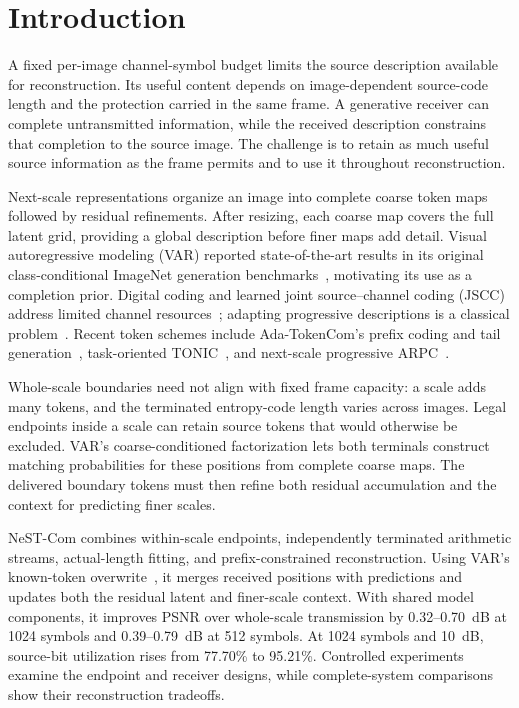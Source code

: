 \section{Introduction}
A fixed per-image channel-symbol budget limits the source description available for reconstruction. Its useful content depends on image-dependent source-code length and the protection carried in the same frame. A generative receiver can complete untransmitted information, while the received description constrains that completion to the source image. The challenge is to retain as much useful source information as the frame permits and to use it throughout reconstruction.

Next-scale representations organize an image into complete coarse token maps followed by residual refinements. After resizing, each coarse map covers the full latent grid, providing a global description before finer maps add detail. Visual autoregressive modeling (VAR) reported state-of-the-art results in its original class-conditional ImageNet generation benchmarks~\cite{var}, motivating its use as a completion prior. Digital coding and learned joint source--channel coding (JSCC) address limited channel resources~\cite{deepjscc,swinjscc}; adapting progressive descriptions is a classical problem~\cite{chande}. Recent token schemes include Ada-TokenCom's prefix coding and tail generation~\cite{adatokencom}, task-oriented TONIC~\cite{tonic}, and next-scale progressive ARPC~\cite{arpc}.

Whole-scale boundaries need not align with fixed frame capacity: a scale adds many tokens, and the terminated entropy-code length varies across images. Legal endpoints inside a scale can retain source tokens that would otherwise be excluded. VAR's coarse-conditioned factorization lets both terminals construct matching probabilities for these positions from complete coarse maps. The delivered boundary tokens must then refine both residual accumulation and the context for predicting finer scales.

NeST-Com combines within-scale endpoints, independently terminated arithmetic streams, actual-length fitting, and prefix-constrained reconstruction. Using VAR's known-token overwrite~\cite{var}, it merges received positions with predictions and updates both the residual latent and finer-scale context. With shared model components, it improves PSNR over whole-scale transmission by 0.32--0.70~dB at 1024 symbols and 0.39--0.79~dB at 512 symbols. At 1024 symbols and 10~dB, source-bit utilization rises from 77.70\% to 95.21\%. Controlled experiments examine the endpoint and receiver designs, while complete-system comparisons show their reconstruction tradeoffs.
